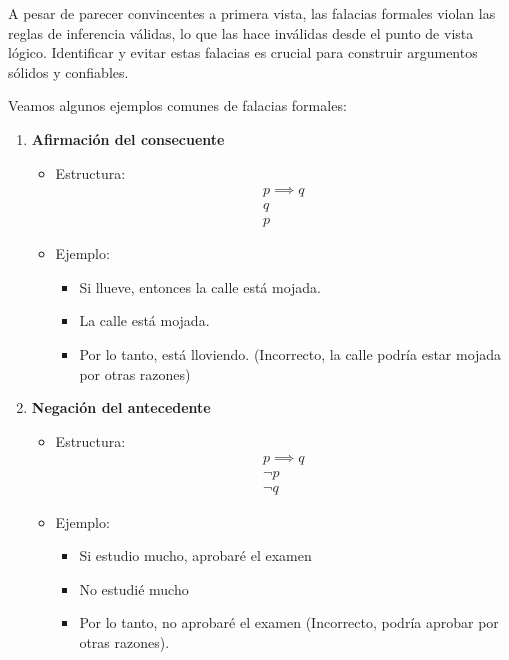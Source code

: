 A pesar de parecer convincentes a primera vista, las falacias formales violan las reglas de inferencia válidas, lo que las hace inválidas desde el punto de vista lógico. Identificar y evitar estas falacias es crucial para construir argumentos sólidos y confiables.

Veamos algunos ejemplos comunes de falacias formales:

\begin{enumerate}
	\item \textbf{Afirmación del consecuente} 
	
	\begin{itemize}
		\item Estructura:
		\[ \begin{array}{l}
			p \implies q\\
			q \\ \hline
			p
		\end{array} \]
		\item Ejemplo:
		\begin{itemize}
			\item Si llueve, entonces la calle está mojada.
			\item La calle está mojada.
			\item Por lo tanto, está lloviendo. (Incorrecto, la calle podría estar mojada por otras razones)
		\end{itemize}
	\end{itemize}
	
	\item \textbf{Negación del antecedente} 
	\begin{itemize}
		\item Estructura:
		\[ \begin{array}{l}
			p \implies q\\
			\neg p \\ \hline
			\neg q
		\end{array} \]
		\item Ejemplo:
		\begin{itemize}[itemsep=-5pt]
			\item Si estudio mucho, aprobaré el examen
			\item No estudié mucho
			\item Por lo tanto, no aprobaré el examen (Incorrecto, podría aprobar por otras razones).
		\end{itemize}
	\end{itemize}
	

\end{enumerate}
